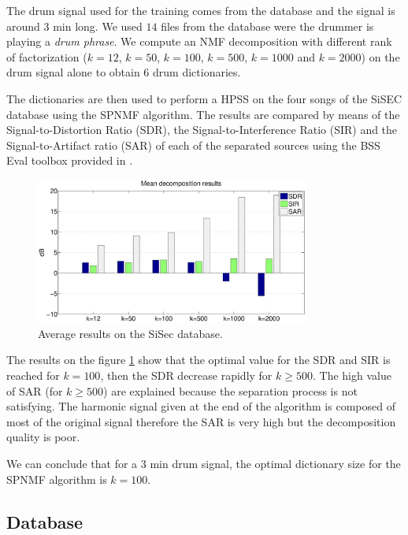 \documentclass{article}
\begin{document}
The drum signal used for the training comes from the database \cite{gillet2006enst} and the signal is around $3$ min long. We used $14$ files from the database were the drummer is playing a \emph{drum phrase}. We compute an NMF decomposition with different rank of factorization ($k=12$, $k=50$, $k=100$, $k=500$, $k=1000$ and $k=2000$) on the drum signal alone to obtain $6$  drum dictionaries.

The dictionaries are then used to perform a HPSS on the four songs of the SiSEC database using the SPNMF algorithm. The results are compared by means of the Signal-to-Distortion Ratio (SDR), the Signal-to-Interference Ratio (SIR) and the Signal-to-Artifact ratio (SAR) of each of the separated sources using the BSS Eval toolbox provided in \cite{bsseval}.

\begin{figure}[h]

  \centering 
  \includegraphics[width=9cm]{figs/AllDictSizeISMIR.eps}
  \caption{\label{dictsize} Average results on the SiSec database.}
  
\end{figure}

The results on the figure \ref{dictsize} show that the optimal value for the SDR and SIR is reached for $k=100$, then the SDR decrease rapidly for $k\geqslant 500$. The high value of SAR (for $k\geqslant 500$) are explained because the separation process is not satisfying. The harmonic signal given at the end of the algorithm is composed of most of the original signal therefore the SAR is very high but the decomposition quality is poor. 

We can conclude that for a $3$ min drum signal, the optimal dictionary size for the SPNMF algorithm is $k=100$.  

\subsection{Database}\label{database}
\end{document}
